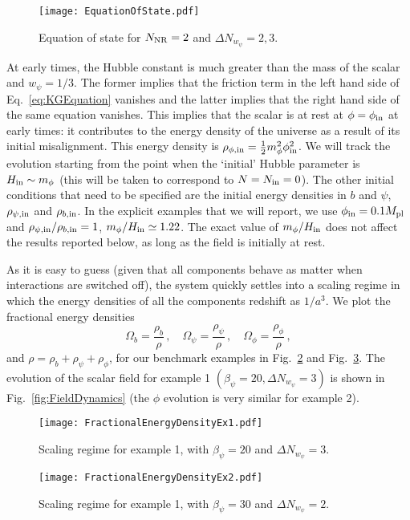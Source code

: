 \documentclass[a4paper, amsfonts, amssymb, amsmath, reprint, showkeys, nofootinbib, twoside, superscriptaddress]{revtex4-1}
\def\mpl{M_{\rm pl}}
\def\mpl{M_{\rm pl}}
\begin{document}
\begin{figure}[h!]
  \texttt{[image: EquationOfState.pdf]}
\caption{Equation of state for $N_{\rm NR} = 2$ and $\Delta N_{w_\psi} = 2,3$.}
\label{fig:EoS}
\end{figure}

At early times, the Hubble constant is much greater than the mass of the scalar and $w_{\psi} =1/3$. The former implies that the friction term in the left hand side of Eq.~\eqref{eq:KGEquation} vanishes and the latter implies that the right hand side of the same equation vanishes. This implies that the scalar is at rest at $\phi = \phi_{\rm in}$ at early times: it contributes to the energy density of the universe as a result of its initial misalignment. This energy density is $\rho_{\phi, \rm{in}} = {1 \over 2} m_\phi^{2} \phi_{\rm in}^2$. We will track the evolution starting from the point when the ‘initial’ Hubble parameter is $H_{\rm in} \sim m_\phi$ (this will be taken to correspond to $N=N_{\rm in}=0$). The other initial conditions that need to be specified are the initial energy densities in $b$ and $\psi$, $\rho_{\psi, \rm{in}}$ and $\rho_{b, \rm{in}}$. In the explicit examples that we will report, we use $\phi_{\rm{in}} = 0.1 \mpl$ and $\rho_{\psi, \rm{in}}/\rho_{b, \rm{in}} = 1$, $m_\phi/H_{\rm in} \simeq 1.22$. The exact value of $m_\phi/H_{\rm in}$ does not affect the results reported below, as long as the field is initially at rest.

As it is easy to guess (given that all components behave as matter when interactions are switched off), the system quickly settles into a scaling regime in which the energy densities of all the components redshift as $1/a^3$. We plot the fractional energy densities 
%
\begin{equation}
\Omega_b = \frac{\rho_b}{\rho} \,, \quad \Omega_{\psi} = \frac{\rho_\psi}{\rho} \,, \quad \Omega_\phi = \frac{\rho_\phi}{\rho} \,,
\end{equation}
and $\rho = \rho_b + \rho_\psi + \rho_\phi$, for our benchmark examples in Fig.~\ref{fig:ScalingRegime1} and Fig.~\ref{fig:ScalingRegime2}. The evolution of the scalar field for example 1 $(\beta_{\psi} =20, \Delta N_{w_\psi} = 3)$ is shown in Fig.~\ref{fig:FieldDynamics} (the $\phi$ evolution is very similar for example 2).

\begin{figure}[h!]
  \texttt{[image: FractionalEnergyDensityEx1.pdf]}
\caption{Scaling regime for example 1, with $\beta_\psi = 20$ and $\Delta N_{w_\psi} = 3$.}
\label{fig:ScalingRegime1}
\end{figure}
\begin{figure}[h!]
  \texttt{[image: FractionalEnergyDensityEx2.pdf]}
\caption{Scaling regime for example 1, with $\beta_\psi = 30$ and $\Delta N_{w_\psi} = 2$.}
\label{fig:ScalingRegime2}
\end{figure}
\end{document}
